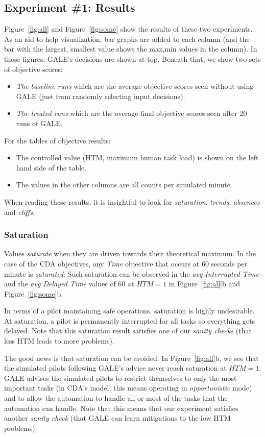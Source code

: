 \documentclass[journal]{IEEEtran}
\newcommand{\bi}{\begin{itemize}}
\newcommand{\ei}{\end{itemize}}
\newcommand{\fig}[1]{Figure~\ref{fig:#1}}
\begin{document}
\subsection{Experiment \#1: Results}
\fig{all} and \fig{some} show the results of these two experiments.
As an aid to help visualization, bar graphs are added to each column (and the bar with the largest, smallest value shows the max,min values in the column).
In those figures, GALE's decisions are shown at top.
Beneath that, we show two sets of objective scores:
\bi
\item {\em The baseline runs} which are the average objective scores seen without using GALE (just from randomly selecting input decisions).
\item {\em The treated runs} which are the average final objective scores seen after 20 runs of GALE.
\ei
For the tables of objective results:
\bi
\item The controlled value (HTM, maximum human task load) is shown on the left hand side of the table.
\item The values in the other columns are all counts per simulated minute.
\ei
When reading these results, it is insightful to look for {\em saturation}, {\em trends}, {\em absences} and {\em cliffs}. 


\subsubsection{Saturation}

Values {\em saturate} when they are driven towards their theoretical maximum. 
In the case of the CDA objectives, any {\em Time} objective that occurs at 60 seconds per minute is {\em saturated}. 
Such saturation can be observed in the {\em avg Interrupted Time} and the {\em avg Delayed Time} values of 60 at  $\mathit{HTM}=1$ in \fig{all}b and \fig{some}b.

In terms of a pilot maintaining safe operations, saturation is highly undesirable. At saturation, a pilot is permanently interrupted for all tasks so everything gets delayed.  
Note that this saturation result satisfies  one of our {\em sanity checks} (that less HTM leads to more problems).

The good news is that saturation can be avoided. 
In \fig{all}b, we see that the simulated pilots following GALE's advice never
reach saturation at $\mathit{HTM}=1$.
GALE advises the simulated pilots to restrict themselves to only the most important tasks (in CDA's model, this means operating in {\em opportunistic} mode) and to allow the automation to handle all or most of the tasks that the automation can handle.
Note that this  means that our experiment satisfies  another {\em sanity check} (that GALE can learn mitigations to the low HTM problems).
\end{document}
